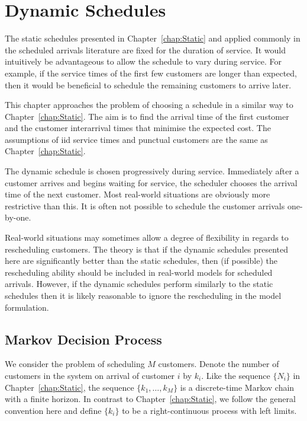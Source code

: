 \chapter{Dynamic Schedules}
\label{chap:Dynamic}
The static schedules presented in Chapter~\ref{chap:Static} and applied commonly in the scheduled arrivals literature are fixed for the duration of service. It would intuitively be advantageous to allow the schedule to vary during service. For example, if the service times of the first few customers are longer than expected, then it would be beneficial to schedule the remaining customers to arrive later.

This chapter approaches the problem of choosing a schedule in a similar way to Chapter~\ref{chap:Static}. The aim is to find the arrival time of the first customer and the customer interarrival times that minimise the expected cost. The assumptions of iid service times and punctual customers are the same as Chapter~\ref{chap:Static}.

The dynamic schedule is chosen progressively during service. Immediately after a customer arrives and begins waiting for service, the scheduler chooses the arrival time of the next customer. Most real-world situations are obviously more restrictive than this. It is often not possible to schedule the customer arrivals one-by-one.

Real-world situations may sometimes allow a degree of flexibility in regards to rescheduling customers. The theory is that if the dynamic schedules presented here are significantly better than the static schedules, then (if possible) the rescheduling ability should be included in real-world models for scheduled arrivals. However, if the dynamic schedules perform similarly to the static schedules then it is likely reasonable to ignore the rescheduling in the model formulation.

\section{Markov Decision Process}
We consider the problem of scheduling $M$ customers. Denote the number of customers in the system on arrival of customer $i$ by $k_{i}$. Like the sequence $\{ N_{i} \}$ in Chapter~\ref{chap:Static}, the sequence $\{ k_{1}, \ldots, k_{M} \}$ is a discrete-time Markov chain with a finite horizon. In contrast to Chapter~\ref{chap:Static}, we follow the general convention here and define $\{ k_{i} \}$ to be a right-continuous process with left limits.

